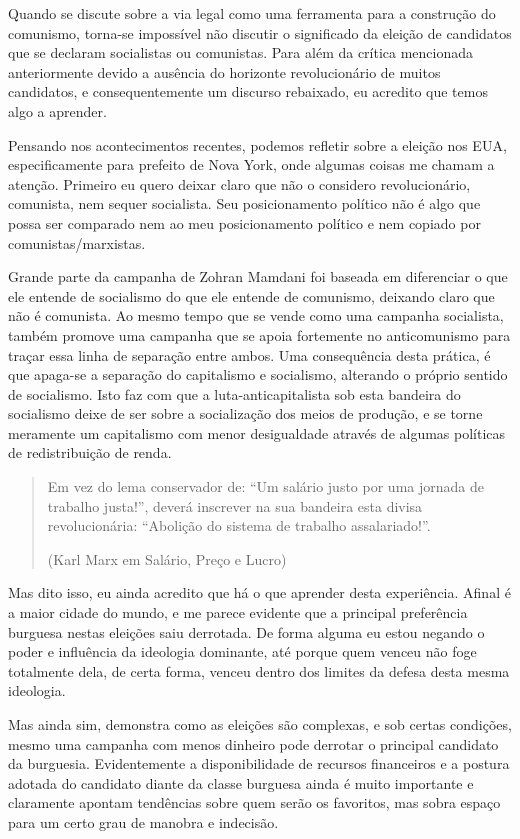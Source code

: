 Quando se discute sobre a via legal como uma ferramenta para a construção do comunismo, torna-se impossível não discutir o significado da eleição de candidatos que se declaram socialistas ou comunistas. Para além da crítica mencionada anteriormente devido a ausência do horizonte revolucionário de muitos candidatos, e consequentemente um discurso rebaixado, eu acredito que temos algo a aprender.

Pensando nos acontecimentos recentes, podemos refletir sobre a eleição nos EUA, especificamente para prefeito de Nova York, onde algumas coisas me chamam a atenção. Primeiro eu quero deixar claro que não o considero revolucionário, comunista, nem sequer socialista. Seu posicionamento político não é algo que possa ser comparado nem ao meu posicionamento político e nem copiado por comunistas/marxistas. 

Grande parte da campanha de Zohran Mamdani foi baseada em diferenciar o que ele entende de socialismo do que ele entende de comunismo, deixando claro que não é comunista. Ao mesmo tempo que se vende como uma campanha socialista, também promove uma campanha que se apoia fortemente no anticomunismo para traçar essa linha de separação entre ambos. Uma consequência desta prática, é que apaga-se a separação do capitalismo e socialismo, alterando o próprio sentido de socialismo. Isto faz com que a luta-anticapitalista sob esta bandeira do socialismo deixe de ser sobre a socialização dos meios de produção, e se torne meramente um capitalismo com menor desigualdade através de algumas políticas de redistribuição de renda.

\begin{quote}
Em vez do lema conservador de: “Um salário justo por uma jornada de trabalho justa!”, deverá inscrever na sua bandeira esta divisa revolucionária: “Abolição do sistema de trabalho assalariado!”.

(Karl Marx em Salário, Preço e Lucro)
\end{quote}

Mas dito isso, eu ainda acredito que há o que aprender desta experiência. Afinal é a maior cidade do mundo, e me parece evidente que a principal preferência burguesa nestas eleições saiu derrotada. De forma alguma eu estou negando o poder e influência da ideologia dominante, até porque quem venceu não foge totalmente dela, de certa forma, venceu dentro dos limites da defesa desta mesma ideologia.

Mas ainda sim, demonstra como as eleições são complexas, e sob certas condições, mesmo uma campanha com menos dinheiro pode derrotar o principal candidato da burguesia. Evidentemente a disponibilidade de recursos financeiros e a postura adotada do candidato diante da classe burguesa ainda é muito importante e claramente apontam tendências sobre quem serão os favoritos, mas sobra espaço para um certo grau de manobra e indecisão.

